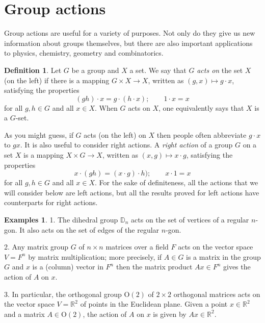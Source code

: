\documentclass[11pt,oneside]{article}
\theoremstyle{definition}
\newtheorem{defn}[thm]{Definition}
\newtheorem{examples}[thm]{Examples}
\newcommand{\R}{\mathbb{R}} %
\renewcommand{\O}{\mathrm{O}}
\newcommand{\D}{\mathbb{D}}
\begin{document}
\setcounter{section}{24}

\section{Group actions}\noindent
Group actions are useful for a variety of purposes. Not only do they
give us new information about groups themselves, but there are also
important applications to physics, chemistry, geometry and
combinatorics. 


\begin{defn}
Let $G$ be a group and $X$ a set. We say that $G$ \emph{acts on} the
set $X$ (on the left) if there is a mapping $G \times X \to X$,
written as $(g,x) \mapsto g\cdot x$, satisfying the properties
\[
  (gh)\cdot x = g\cdot(h\cdot x); \qquad  1\cdot x = x 
\]
for all $g,h \in G$ and all $x \in X$.  When $G$ acts on $X$, one
equivalently says that $X$ is a $G$-set.
\end{defn}

As you might guess, if $G$ acts (on the left) on $X$ then people often
abbreviate $g\cdot x$ to $gx$.  It is also useful to consider right
actions. A \emph{right action} of a group $G$ on a set $X$ is a
mapping $X \times G \to X$, written as $(x,g) \mapsto x\cdot g$,
satisfying the properties
\[
  x\cdot (gh) = (x \cdot g)\cdot h); \qquad  x \cdot 1 = x 
\]
for all $g,h \in G$ and all $x \in X$. For the sake of definiteness,
all the actions that we will consider below are left actions, but all
the results proved for left actions have counterparts for right
actions.


\begin{examples}
  1. The dihedral group $\D_n$ acts on the set
  of vertices of a regular $n$-gon. It also acts on the set of edges
  of the regular $n$-gon.

2. Any matrix group $G$ of $n \times n$ matrices over a field $F$ acts
on the vector space $V = F^n$ by matrix multiplication; more
precisely, if $A \in G$ is a matrix in the group $G$ and $x$ is a
(column) vector in $F^n$ then the matrix product $Ax \in F^n$ gives
the action of $A$ on $x$.

3. In particular, the orthogonal group $\O(2)$ of $2 \times 2$
orthogonal matrices acts on the vector space $V=\R^2$ of points in the
Euclidean plane. Given a point $x \in \R^2$ and a matrix $A \in
\O(2)$, the action of $A$ on $x$ is given by $Ax \in \R^2$.
\end{examples}
\end{document}
